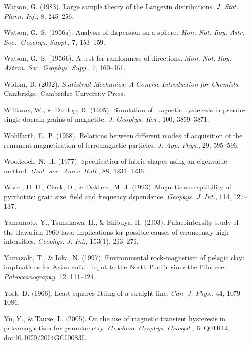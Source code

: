 \documentclass[,plain]{tauxe}
\begin{document}
\begin{thebibliography}{}
\bibitem{}%
Watson, G. (1983).
Large sample theory of the Langevin distributions.
{\it J. Stat. Plann. Inf.}, 8, 245--256.

\bibitem{}%
Watson, G.~S. (1956a).
Analysis of dispersion on a sphere.
{\it Mon. Not. Roy. Astr. Soc., Geophys. Suppl.}, 7, 153--159.

\bibitem{}%
Watson, G.~S. (1956b).
A test for randomness of directions.
{\it Mon. Not. Roy. Astron. Soc. Geophys. Supp.}, 7, 160--161.

\bibitem{}%
Widom, B. (2002).
{\it Statistical Mechanics: A Concise Introduction for Chemists}.
Cambridge: Cambridge University Press.

\bibitem{}%
Williams, W., \& Dunlop, D. (1995).
Simulation of magnetic hysteresis in pseudo-single-domain grains of magnetite.
{\it J. Geophys. Res.}, 100, 3859--3871.

\bibitem{}%
Wohlfarth, E.~P. (1958).
Relations between different modes of acquisition of the remanent magnetisation of ferromagnetic particles.
{\it J. App. Phys.}, 29, 595--596.

\bibitem{}%
Woodcock, N.~H. (1977).
Specification of fabric shapes using an eigenvalue method.
{\it Geol. Soc. Amer. Bull.}, 88, 1231--1236.

\bibitem{}%
Worm, H. U., Clark, D., \& Dekkers, M. J. (1993). Magnetic
susceptibility of pyrrhotite: grain size, field and frequency
dependence. {\it Geophys. J. Int.}, 114, 127--137.

\bibitem{}%
Yamamoto, Y., Tsunakawa, H., \& Shibuya, H. (2003).
Palaeointensity study of the Hawaiian 1960 lava: implications for possible causes of erroneously high intensities.
{\it Geophys. J. Int.}, 153(1), 263--276.

\bibitem{}%
Yamazaki, T., \& Ioka, N. (1997).
Environmental rock-magnetism of pelagic clay: implications for Asian eolian input to the North Pacific since the Pliocene.
{\it Paleoceanography}, 12, 111--124.

\bibitem{}%
York, D. (1966).
Least-squares fitting of a straight line.
{\it Can. J. Phys.}, 44, 1079--1086.

\bibitem{}%
Yu, Y., \& Tauxe, L. (2005).
On the use of magnetic transient hysteresis in paleomagnetism for granulometry.
{\it Geochem. Geophys. Geosyst.}, 6, Q01H14, doi:10.1029/2004GC000839.


\end{thebibliography}
\end{document}
